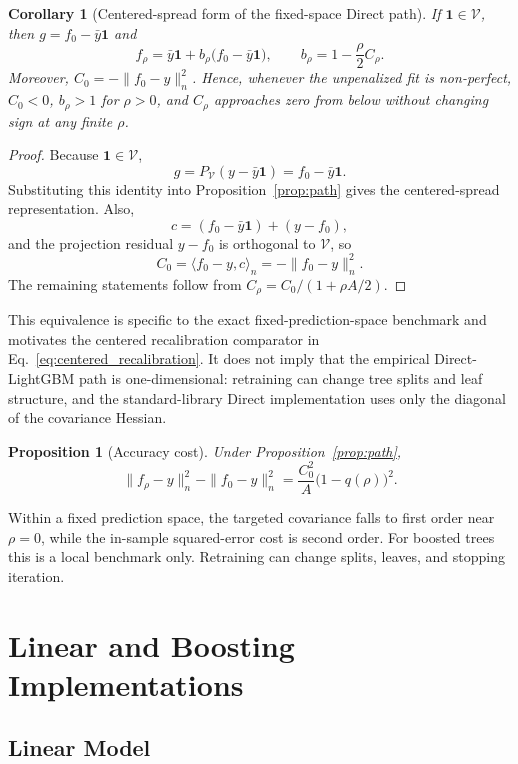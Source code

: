 \documentclass[10pt]{article}
\newtheorem{proposition}{Proposition}
\newtheorem{corollary}{Corollary}
\theoremstyle{definition}
\newcommand{\1}{\mathbf{1}}
\newcommand{\Vcal}{\mathcal{V}}
\begin{document}
{\color{impGreen}
\begin{corollary}[Centered-spread form of the fixed-space Direct path]
\label{cor:path_scaling}
If $\1\in\Vcal$, then $g=f_0-\bar y\1$ and
\[
f_\rho
=
\bar y\1
+
b_\rho\bigl(f_0-\bar y\1\bigr),
\qquad
b_\rho
=
1-\frac{\rho}{2}C_\rho.
\]
Moreover, $C_0=-\|f_0-y\|_n^2$. Hence, whenever the unpenalized fit is non-perfect, $C_0<0$, $b_\rho>1$ for $\rho>0$, and $C_\rho$ approaches zero from below without changing sign at any finite $\rho$.
\end{corollary}

\begin{proof}
Because $\1\in\Vcal$,
\[
g=P_{\Vcal}(y-\bar y\1)=f_0-\bar y\1.
\]
Substituting this identity into Proposition~\ref{prop:path} gives the centered-spread representation. Also,
\[
c=(f_0-\bar y\1)+(y-f_0),
\]
and the projection residual $y-f_0$ is orthogonal to $\Vcal$, so
\[
C_0
=
\langle f_0-y,c\rangle_n
=
-\|f_0-y\|_n^2.
\]
The remaining statements follow from $C_\rho=C_0/(1+\rho A/2)$.
\end{proof}

This equivalence is specific to the exact fixed-prediction-space benchmark and motivates the centered recalibration comparator in Eq.~\eqref{eq:centered_recalibration}. It does not imply that the empirical Direct-LightGBM path is one-dimensional: retraining can change tree splits and leaf structure, and the standard-library Direct implementation uses only the diagonal of the covariance Hessian.
}

\begin{proposition}[Accuracy cost]
\label{prop:path_cost}
Under Proposition~\ref{prop:path},
\[
\|f_\rho-y\|_n^2-\|f_0-y\|_n^2
=
\frac{C_0^2}{A}\bigl(1-q(\rho)\bigr)^2.
\]
\end{proposition}

Within a fixed prediction space, the targeted covariance falls to first order near $\rho=0$, while the in-sample squared-error cost is second order. For boosted trees this is a local benchmark only. Retraining can change splits, leaves, and stopping iteration.

\section{Linear and Boosting Implementations}
\label{app:implementation}


\subsection{Linear Model}
\end{document}

